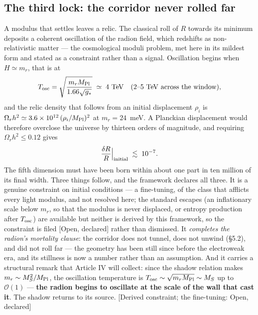 \subsection{The third lock: the corridor never rolled far}
A modulus that settles leaves a relic. The classical roll of $R$ towards its minimum deposits a coherent oscillation of the radion field, which redshifts as non-relativistic matter --- the cosmological moduli problem, met here in its mildest form and stated as a constraint rather than a signal. Oscillation begins when $H\simeq m_{r}$, that is at
\begin{equation}
T_{\rm osc}=\sqrt{\frac{m_{r}M_{\rm Pl}}{1.66\sqrt{g_{*}}}}\;\simeq\;4~\mathrm{TeV}\quad (2\text{--}5~\mathrm{TeV}\ \text{across the window}),
\end{equation}
and the relic density that follows from an initial displacement $\rho_{i}$ is $\Omega_{r}h^{2}\simeq3.6\times10^{12}\,(\rho_{i}/M_{\rm Pl})^{2}$ at $m_{r}=24$~meV. A Planckian displacement would therefore overclose the universe by thirteen orders of magnitude, and requiring $\Omega_{r}h^{2}\leq0.12$ gives
\begin{equation}
\frac{\delta R}{R}\Big|_{\rm initial}\;\lesssim\;10^{-7}.
\end{equation}
The fifth dimension must have been born within about one part in ten million of its final width. Three things follow, and the framework declares all three. It is a genuine constraint on initial conditions --- a fine-tuning, of the class that afflicts every light modulus, and not resolved here; the standard escapes (an inflationary scale below $m_{r}$, so that the modulus is never displaced, or entropy production after $T_{\rm osc}$) are available but neither is derived by this framework, so the constraint is filed [Open, declared] rather than dismissed. It \emph{completes the radion's mortality clause}: the corridor does not tunnel, does not unwind (\S5.2), and did not roll far --- the geometry has been still since before the electroweak era, and its stillness is now a number rather than an assumption. And it carries a structural remark that Article IV will collect: since the shadow relation makes $m_{r}\sim M_{S}^{2}/M_{\rm Pl}$, the oscillation temperature is $T_{\rm osc}\sim\sqrt{m_{r}M_{\rm Pl}}\sim M_{S}$ up to $\mathcal{O}(1)$ --- \textbf{the radion begins to oscillate at the scale of the wall that cast it}. The shadow returns to its source. [Derived constraint; the fine-tuning: Open, declared]

